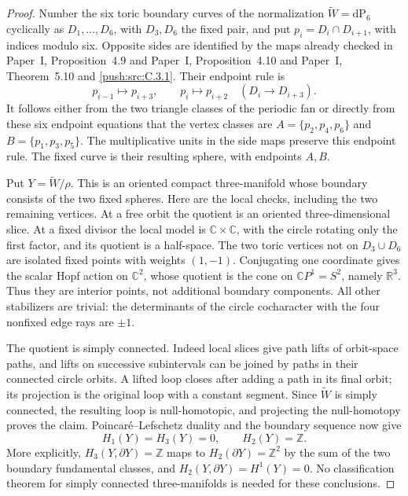 \begin{proof}
Number the six toric boundary curves of the normalization
\(\widetilde W=\mathrm{dP}_6\) cyclically as
\(D_1,\ldots,D_6\), with \(D_3,D_6\) the fixed pair, and put
\(p_i=D_i\cap D_{i+1}\), with indices modulo six. Opposite sides
are identified by the maps already checked in Paper~I, Proposition~4.9 and Paper~I, Proposition~4.10 and Paper~I, Theorem~5.10 and \ref{push:src:C.3.1}.
Their endpoint rule is
\[
 p_{i-1}\longmapsto p_{i+3},\qquad
 p_i\longmapsto p_{i+2}\quad(D_i\longrightarrow D_{i+3}).
\]
It follows either from the two triangle classes of the periodic
fan or directly from these six endpoint equations that the vertex
classes are
\(A=\{p_2,p_4,p_6\}\) and \(B=\{p_1,p_3,p_5\}\).
The multiplicative units in the side maps preserve this endpoint
rule. The fixed curve is their resulting sphere, with endpoints
\(A,B\).

Put \(Y=\widetilde W/\rho\). This is an oriented compact
three-manifold whose boundary consists of the two fixed spheres.
Here are the local checks, including the two remaining vertices.
At a free orbit the quotient is an oriented three-dimensional
slice. At a fixed divisor the local model is
\(\mathbb C\times\mathbb C\), with the circle rotating only
the first factor, and its quotient is a half-space. The two toric
vertices not on \(D_3\cup D_6\) are isolated fixed points with
weights \((1,-1)\). Conjugating one coordinate gives the scalar
Hopf action on \(\mathbb C^2\), whose quotient is the cone on
\(\mathbb CP^1=S^2\), namely \(\mathbb R^3\). Thus they are
interior points, not additional boundary components.
All other stabilizers are trivial: the determinants of the circle
cocharacter with the four nonfixed edge rays are \(\pm1\).

The quotient is simply connected. Indeed local slices give path
lifts of orbit-space paths, and lifts on successive subintervals
can be joined by paths in their connected circle orbits. A lifted
loop closes after adding a path in its final orbit; its projection
is the original loop with a constant segment. Since
\(\widetilde W\) is simply connected, the resulting loop is
null-homotopic, and projecting the null-homotopy proves the claim.
Poincar\'e--Lefschetz duality and the boundary sequence now give
\[
 H_1(Y)=H_3(Y)=0,\qquad H_2(Y)=\mathbb Z.
\]
More explicitly, \(H_3(Y,\partial Y)=\mathbb Z\) maps to
\(H_2(\partial Y)=\mathbb Z^2\) by the sum of the two boundary
fundamental classes, and \(H_2(Y,\partial Y)=H^1(Y)=0\).
No classification theorem for simply connected three-manifolds
is needed for these conclusions.


\end{proof}
